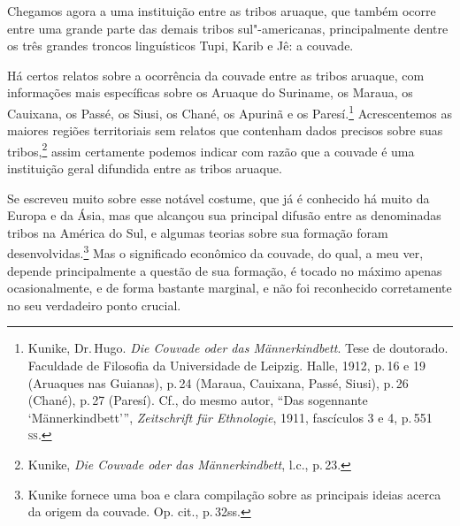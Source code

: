 Chegamos agora a uma instituição entre as tribos aruaque, que também
ocorre entre uma grande parte das demais tribos sul"-americanas,
principalmente dentre os três grandes troncos linguísticos Tupi, Karib
e Jê: a couvade.

Há certos relatos sobre a ocorrência da couvade entre as tribos aruaque,
com informações mais específicas sobre os Aruaque do Suriname, os
Maraua, os Cauixana, os Passé, os Siusi, os Chané, os Apurinã e os
Paresí.\footnote{Kunike, Dr.\,Hugo. \textit{Die Couvade oder das
  Männerkindbett}. Tese de doutorado. Faculdade de Filosofia da
  Universidade de Leipzig. Halle, 1912, p.\,16 e 19 (Aruaques nas
  Guianas), p.\,24 (Maraua, Cauixana, Passé, Siusi), p.\,26 (Chané), p.\,27
  (Paresí). Cf., do mesmo autor, ``Das sogennante `Männerkindbett''',
  \textit{Zeitschrift für Ethnologie}, 1911, fascículos 3 e 4, p.\,551 \textsc{ss}.}
Acrescentemos as maiores regiões territoriais sem relatos que contenham
dados precisos sobre suas tribos,\footnote{Kunike, \textit{Die Couvade oder
  das Männerkindbett}, l.c., p.\,23.} assim certamente podemos indicar
com razão que a couvade é uma instituição geral difundida entre as
tribos aruaque.

Se escreveu muito sobre esse notável costume, que já é conhecido há
muito da Europa e da Ásia, mas que alcançou sua principal difusão entre
as denominadas tribos na América do Sul, e algumas teorias sobre sua
formação foram desenvolvidas.\footnote{Kunike fornece uma boa e clara
  compilação sobre as principais ideias acerca da origem da couvade. Op.
  cit., p.\,32ss.} Mas o significado econômico da couvade, do qual, a
meu ver, depende principalmente a questão de sua formação, é tocado no
máximo apenas ocasionalmente, e de forma bastante marginal, e não foi
reconhecido corretamente no seu verdadeiro ponto crucial.

